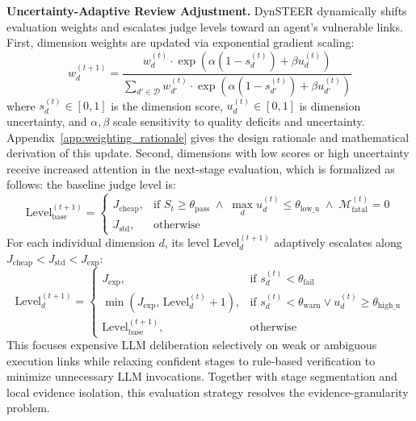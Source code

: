 \textbf{Uncertainty-Adaptive Review Adjustment.} DynSTEER dynamically shifts evaluation weights and escalates judge levels toward an agent's vulnerable links. First, dimension weights are updated via exponential gradient scaling:
\begin{equation}
    w_d^{(t+1)} = \frac{w_d^{(t)} \cdot \exp\left( \alpha (1 - s_d^{(t)}) + \beta u_d^{(t)} \right)}{\sum_{d' \in \mathcal{D}} w_{d'}^{(t)} \cdot \exp\left( \alpha (1 - s_{d'}^{(t)}) + \beta u_{d'}^{(t)} \right)}
    \label{eq:weight_update}
\end{equation}
where $s_d^{(t)} \in [0, 1]$ is the dimension score, $u_d^{(t)} \in [0, 1]$ is dimension uncertainty, and $\alpha, \beta$ scale sensitivity to quality deficits and uncertainty. Appendix~\ref{app:weighting_rationale} gives the design rationale and mathematical derivation of this update. Second, dimensions with low scores or high uncertainty receive increased attention in the next-stage evaluation, which is formalized as follows: the baseline judge level is:
\begin{equation}
    \text{Level}_{\text{base}}^{(t+1)} =
    \begin{cases}
    J_{\text{cheap}}, & \text{if } S_t \ge \theta_{\text{pass}} \;\land\; \max_{d} u_d^{(t)} \le \theta_{\text{low\_u}} \;\land\; \mathcal{M}_{\text{fatal}}^{(t)} = 0 \\
    J_{\text{std}}, & \text{otherwise}
    \end{cases}
    \label{eq:level_base}
\end{equation}
For each individual dimension $d$, its level $\text{Level}_d^{(t+1)}$ adaptively escalates along $J_{\text{cheap}} < J_{\text{std}} < J_{\text{exp}}$:
\begin{equation}
    \text{Level}_d^{(t+1)} =
    \begin{cases}
    J_{\text{exp}}, & \text{if } s_d^{(t)} < \theta_{\text{fail}} \\
    \min\left(J_{\text{exp}},\, \text{Level}_d^{(t)} + 1\right), & \text{if } s_d^{(t)} < \theta_{\text{warn}} \lor u_d^{(t)} \ge \theta_{\text{high\_u}} \\
    \text{Level}_{\text{base}}^{(t+1)}, & \text{otherwise}
    \end{cases}
    \label{eq:level_dim}
\end{equation}
This focuses expensive LLM deliberation selectively on weak or ambiguous execution links while relaxing confident stages to rule-based verification to minimize unnecessary LLM invocations.
Together with stage segmentation and local evidence isolation, this evaluation strategy resolves the evidence-granularity problem. 

